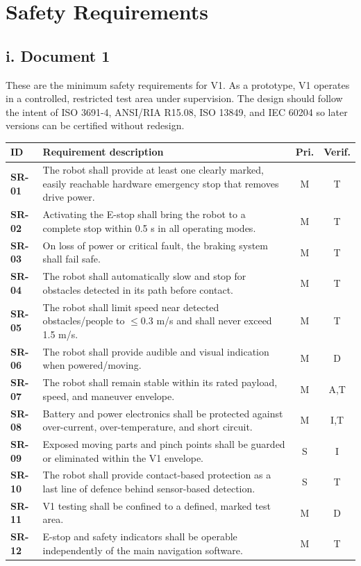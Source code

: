 \chapter{Safety Requirements}

\section*{i. Document 1}

These are the minimum safety requirements for V1. As a prototype, V1 operates in a controlled, restricted test area under supervision. The design should follow the intent of ISO 3691-4, ANSI/RIA R15.08, ISO 13849, and IEC 60204 so later versions can be certified without redesign.

\begin{longtable}{>{\bfseries}L{0.12\textwidth}L{0.65\textwidth}cc}
\toprule
ID & Requirement description & Pri. & Verif. \\
\midrule
\endhead
SR-01 & The robot shall provide at least one clearly marked, easily reachable hardware emergency stop that removes drive power. & M & T \\
SR-02 & Activating the E-stop shall bring the robot to a complete stop within 0.5 s in all operating modes. & M & T \\
SR-03 & On loss of power or critical fault, the braking system shall fail safe. & M & T \\
SR-04 & The robot shall automatically slow and stop for obstacles detected in its path before contact. & M & T \\
SR-05 & The robot shall limit speed near detected obstacles/people to $\leq$0.3 m/s and shall never exceed 1.5 m/s. & M & T \\
SR-06 & The robot shall provide audible and visual indication when powered/moving. & M & D \\
SR-07 & The robot shall remain stable within its rated payload, speed, and maneuver envelope. & M & A,T \\
SR-08 & Battery and power electronics shall be protected against over-current, over-temperature, and short circuit. & M & I,T \\
SR-09 & Exposed moving parts and pinch points shall be guarded or eliminated within the V1 envelope. & S & I \\
SR-10 & The robot shall provide contact-based protection as a last line of defence behind sensor-based detection. & S & T \\
SR-11 & V1 testing shall be confined to a defined, marked test area. & M & D \\
SR-12 & E-stop and safety indicators shall be operable independently of the main navigation software. & M & T \\
\bottomrule
\end{longtable}

